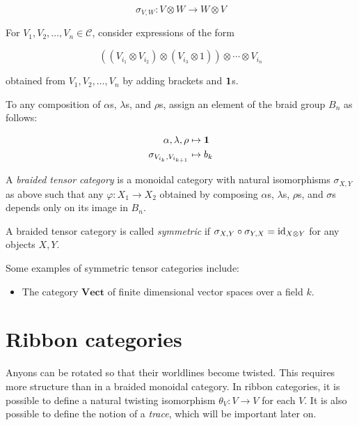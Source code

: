 \begin{equation}
    \sigma_{V,W} : V \otimes W \to W \otimes V
\end{equation}

For $V_1, V_2, \dots, V_n \in \mathcal{C}$, consider expressions of the form 

\begin{equation}
    ((V_{i_1}\otimes V_{i_2}) \otimes (V_{i_3} \otimes 1)) \otimes \cdots \otimes V_{i_n}
\end{equation}

obtained from $V_1,V_2,\ldots,V_n$ by adding brackets and $\mathbf{1}$s.

To any composition of $\alpha$s, $\lambda$s, and $\rho$s, assign an element of the
braid group $B_n$ as follows:

\begin{align}
    \alpha, \lambda, \rho &\mapsto \mathbf{1} \\
    \sigma_{V_{i_k}, V_{i_{k+1}}} &\mapsto b_k
\end{align}

\begin{defn}
    A \emph{braided tensor category} is a monoidal category with natural
    isomorphisms $\sigma_{X,Y}$ as above such that any $\varphi: X_1 \to X_2$
    obtained by composing $\alpha$s, $\lambda$s, $\rho$s, and $\sigma$s depends only
    on its image in $B_n$.
\end{defn}

\begin{defn}
    A braided tensor category is called \emph{symmetric} if $\sigma_{X,Y} \circ
    \sigma_{Y,X} = \operatorname{id}_{X \otimes Y}$ for any objects $X,Y$.
\end{defn}

Some examples of symmetric tensor categories include:

\begin{itemize}
    \item The category $\mathbf{Vect}$ of finite dimensional vector spaces over a field $k$.
\end{itemize}

\section{Ribbon categories}
\label{section:RibbonCategories}

Anyons can be rotated so that their worldlines become twisted. This requires
more structure than in a braided monoidal category.  In ribbon categories, it
is possible to define a natural twisting isomorphism $\theta_V: V\to V$ for
each $V$. It is also possible to define the notion of a \emph{trace}, which
will be important later on.

